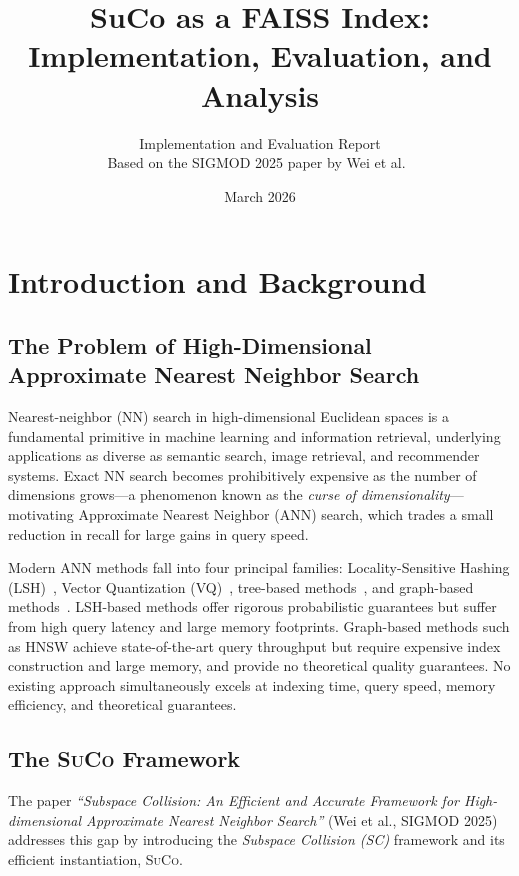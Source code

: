 \documentclass[11pt,a4paper]{article}
\title{\textbf{SuCo as a FAISS Index: Implementation, Evaluation, and Analysis}}
\author{%
  Implementation and Evaluation Report\\[4pt]
  \normalsize Based on the SIGMOD 2025 paper by Wei et al.~\cite{wei2025suco}
}
\date{March 2026}
\newcommand{\suco}{\textsc{SuCo}}
\begin{document}
\maketitle
\tableofcontents
\newpage

\section{Introduction and Background}

\subsection{The Problem of High-Dimensional Approximate Nearest Neighbor Search}

Nearest-neighbor (NN) search in high-dimensional Euclidean spaces is a
fundamental primitive in machine learning and information retrieval, underlying
applications as diverse as semantic search, image retrieval, and recommender
systems.  Exact NN search becomes prohibitively expensive as the number of
dimensions grows---a phenomenon known as the \emph{curse of
dimensionality}---motivating Approximate Nearest Neighbor (ANN) search, which
trades a small reduction in recall for large gains in query speed.

Modern ANN methods fall into four principal families:
Locality-Sensitive Hashing (LSH)~\cite{andoni2015lsh},
Vector Quantization (VQ)~\cite{jegou2010pq},
tree-based methods~\cite{annoy}, and
graph-based methods~\cite{malkov2018hnsw}.
LSH-based methods offer rigorous probabilistic guarantees but suffer from
high query latency and large memory footprints.  Graph-based methods such as
HNSW achieve state-of-the-art query throughput but require expensive index
construction and large memory, and provide no theoretical quality guarantees.
No existing approach simultaneously excels at indexing time, query speed,
memory efficiency, and theoretical guarantees.

\subsection{The \suco{} Framework}

The paper \emph{``Subspace Collision: An Efficient and Accurate Framework for
High-dimensional Approximate Nearest Neighbor Search''} (Wei et al., SIGMOD
2025)~\cite{wei2025suco} addresses this gap by introducing the
\textit{Subspace Collision (SC)} framework and its efficient instantiation,
\suco{}.
\end{document}
